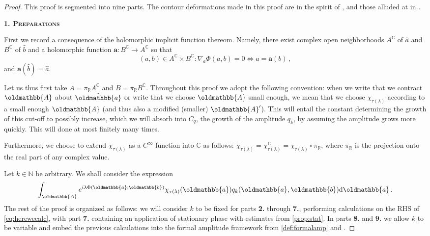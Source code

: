 \documentclass[
	fontsize=11pt, 
	twoside=false, 
	abstract=true, 
	a4paper,
]{scrartcl}
\newcommand{\RR}{\mathbb{R}}
\newcommand{\CC}{\mathbb{C}}
\newcommand{\dd}{\mathrm{d}}
\newcommand{\mf}[1]{\oldmathbb{#1}}
\newcommand{\bsc}[1]{\textbf{\ebgaramond\textsc{#1}}}
\begin{document}
\begin{proof}
	This proof is segmented into nine parts. The contour deformations made in this proof are in the spirit of \cite[Thm.~2.8]{AST_1982__95__R3_0}, \cite[Prop.~1.2]{bonthonneau2020fbi} and those alluded at in \cite[\S~19.3.1]{MR4436039}.

	\bsc{1. Preparations}

	First we record a consequence of the holomorphic implicit function thereom. Namely, there exist complex open neighborhoods $A^\CC$ of $\hat a$ and $B^\CC$ of $\hat b$ and %
	a holomorphic function $\mathbf{a} \colon B^\CC\to A^\CC$ so that 
	\begin{equation}\label{eq:phicrit}
		(a,b) \in A^\CC\times B^\CC\colon \nabla_a\Phi(a,b) = 0 \iff a = \mathbf{a}(b)\,,
	\end{equation}
	and $\mathbf{a}(\hat b) = \hat a$. 
	
	Let us thus first take $A = \pi_\RR A^\CC$ and $B = \pi_\RR B^\CC$. Throughout this proof we adopt the following convention: when we write that we contract $\mf{A}$ about $\hat{\mf{a}}$ or write that we choose $\mf{A}$ small enough, we mean that we choose $\chi_{\tau(\lambda)}$ according to a small enough $\mf{A}$ (and thus also a modified (smaller) $\mf{A}'$). This will entail the constant determining the growth of this cut-off to possibly increase, which we will absorb into $C_q$, the growth of the amplitude $q_k$, by assuming the amplitude grows more quickly. This will done at most finitely many times. %

	Furthermore, we choose to extend $\chi_{\tau(\lambda)}$ as a $C^\infty$ function into $\CC$ as follows: $\chi_{\tau(\lambda)} = \chi_{\tau(\lambda)}^\CC = \chi_{\tau(\lambda)} \circ \pi_\RR$, where $\pi_\RR$ is the projection onto the real part of any complex value.

	Let $k \in \mathbb{N}$ be arbitrary. We shall consider the expression 
	\begin{equation}\label{eq:herewecalc}
		\int_{\mf{A}}e^{i\lambda\Phi(\mf{a};\mf{b})}\chi_{\tau(\lambda)}(\mf{a})q_k(\mf{a},\mf{b})\dd\mf{a}\,.
	\end{equation}
	The rest of the proof is organized as follows: we will consider $k$ to be fixed for parts \bsc{2.} through \bsc{7.}, performing calculations on the RHS of \cref{eq:herewecalc}, with part \bsc{7.} containing an application of stationary phase \cite[Thm.~19.3.3]{MR4436039} with estimates from \cref{prop:stat}. In parts \bsc{8.} and \bsc{9.} we allow $k$ to be variable and embed the previous calculations into the formal amplitude framework from \cref{def:formalamp} and \cite[\S~1]{AST_1982__95__R3_0}. %


\end{proof}
\end{document}

